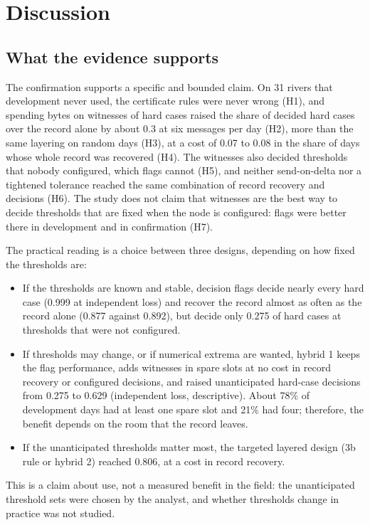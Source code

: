\section{Discussion}
\label{sec:discussion}

\subsection{What the evidence supports}
The confirmation supports a specific and bounded claim. On 31 rivers that development never used, the certificate rules were never wrong (H1), and spending bytes on witnesses of hard cases raised the share of decided hard cases over the record alone by about 0.3 at six messages per day (H2), more than the same layering on random days (H3), at a cost of 0.07 to 0.08 in the share of days whose whole record was recovered (H4). The witnesses also decided thresholds that nobody configured, which flags cannot (H5), and neither send-on-delta nor a tightened tolerance reached the same combination of record recovery and decisions (H6). The study does not claim that witnesses are the best way to decide thresholds that are fixed when the node is configured: flags were better there in development and in confirmation (H7).

The practical reading is a choice between three designs, depending on how fixed the thresholds are:
\begin{itemize}
  \item If the thresholds are known and stable, decision flags decide nearly every hard case (0.999 at independent loss) and recover the record almost as often as the record alone (0.877 against 0.892), but decide only 0.275 of hard cases at thresholds that were not configured.
  \item If thresholds may change, or if numerical extrema are wanted, hybrid 1 keeps the flag performance, adds witnesses in spare slots at no cost in record recovery or configured decisions, and raised unanticipated hard-case decisions from 0.275 to 0.629 (independent loss, descriptive). About 78\% of development days had at least one spare slot and 21\% had four; therefore, the benefit depends on the room that the record leaves.
  \item If the unanticipated thresholds matter most, the targeted layered design (3b rule or hybrid 2) reached 0.806, at a cost in record recovery.
\end{itemize}
This is a claim about use, not a measured benefit in the field: the unanticipated threshold sets were chosen by the analyst, and whether thresholds change in practice was not studied.

